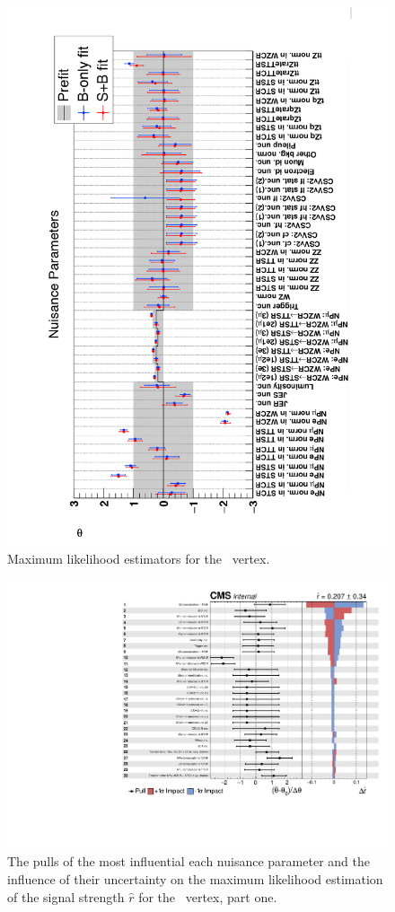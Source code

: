 \begin{figure}[htbp]
	\centering
	\includegraphics[width=.7\linewidth,angle=-90]{6_Search/Figures/impact/171102ZutMLE.pdf}
	\caption{Maximum likelihood estimators for the \Zut\ vertex.}
	\label{fig:171102zutmle}
\end{figure}
\newpage
\begin{figure}[htbp] 
	\centering
	  \includegraphics[page=1,width=.99\linewidth,keepaspectratio]{6_Search/Figures/impact/171102Zut.pdf}
	\caption{The pulls of the most influential each nuisance parameter and the influence of their uncertainty on the maximum likelihood estimation of the signal strength $\hat{r}$ for the \Zut\ vertex, part one.}
	\label{fig:impactsZut1}
\end{figure}


